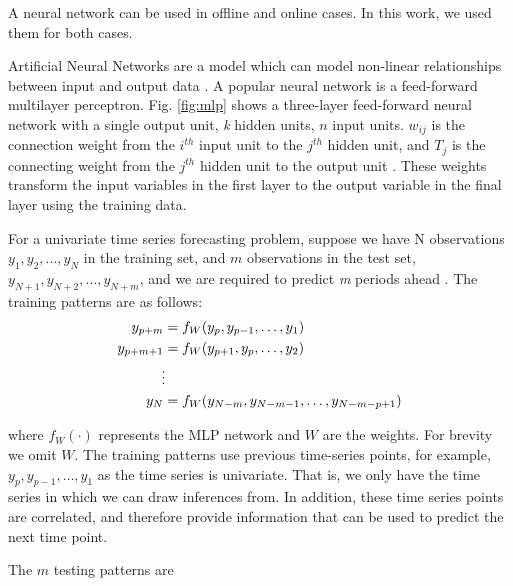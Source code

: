 \documentclass[final,3p,times,twocolumn,numbers]{elsarticle}
\begin{document}
A neural network can be used in offline and online cases. In this work, we used them for both cases.

Artificial Neural Networks are a model which can model non-linear relationships between input and output data \cite{Akaike1974}. A popular neural network is a feed-forward multilayer perceptron. Fig. \ref{fig:mlp} shows a three-layer feed-forward neural network with a single output unit, \textit{k} hidden units, $n$ input units. $w_{ij}$ is the connection weight from the $i^{th}$ input unit to the $j^{th}$ hidden unit,  and $T_j$ is the connecting weight from the $j^{th}$ hidden unit to the output unit \cite{Pao2007}. These weights transform the input variables in the first layer to the output variable in the final layer using the training data. 


For a univariate time series forecasting problem, suppose we have N observations $y_1, y_2, \ldots, y_N$ in the training set, and $m$ observations in the test set, $y_{N+1}, y_{N+2}, \ldots, y_{N+m}$, and we are required to predict \textit{m} periods ahead \cite{Pao2007}. The training patterns are as follows:
\begin{align}
y_{p+m} & =f_{W}(y_p, y_{p-1},\ldots,y_1)\\
y_{p+m+1} & =f_{W}(y_{p+1}, y_{p},\ldots,y_2)\\
&\vdotswithin  \notag \\
y_{N} & =f_{W}(y_{N-m},y_{N-m-1},\ldots,y_{N-m-p+1})
\end{align}

\noindent where $f_{W}(\cdot)$ represents the MLP network and $W$ are the weights. For brevity we omit $W$. The training patterns use previous time-series points, for example, $y_p, y_{p-1},\ldots,y_1$ as the time series is univariate. That is, we only have the time series in which we can draw inferences from. In addition, these time series points are correlated, and therefore provide information that can be used to predict the next time point.

The $m$ testing patterns are 
\end{document}
